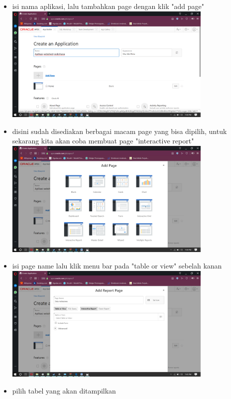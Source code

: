 \documentclass[a4paper,12pt]{report}
\begin{document}
\begin{itemize}
	\item isi nama aplikasi, lalu tambahkan page dengan klik "add page"\\
	\includegraphics[width=10cm]{aplikasi websheet/Screenshot (155).png}\\ 
	\item disini sudah disediakan berbagai macam page yang bisa dipilih, untuk sekarang kita akan coba membuat page "interactive report"\\
	\includegraphics[width=10cm]{aplikasi websheet/Screenshot (156).png}\\ 
	\item isi page name lalu klik menu bar pada "table or view" sebelah kanan\\
	\includegraphics[width=10cm]{aplikasi websheet/Screenshot (157).png}\\ 
	\item pilih tabel yang akan ditampilkan\\

\end{itemize}
\end{document}
